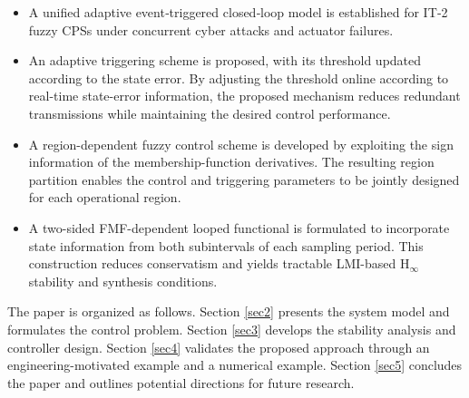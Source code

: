 \documentclass[preprint,review,fleqn,sort&compress,3p]{elsarticle}
\theoremstyle{definition} %
\theoremstyle{definition}%
\begin{document}
\begin{itemize}
	\item[1)] A unified adaptive event‑triggered closed‑loop model is established for IT‑2 fuzzy CPSs under concurrent cyber attacks and actuator failures.
	\item[2)] An adaptive triggering scheme is proposed, with its threshold updated according to the state error. By adjusting the threshold online according to real-time state-error information, the proposed mechanism reduces redundant transmissions while maintaining the desired control performance.
	\item[3)] A region-dependent fuzzy control scheme is developed by exploiting the sign information of the membership-function derivatives. The resulting region partition enables the control and triggering parameters to be jointly designed for each operational region.
	\item[4)] A two-sided FMF-dependent looped functional is formulated to incorporate state information from both subintervals of each sampling period. This construction reduces conservatism and yields tractable LMI-based $\mathrm{H}_\infty$ stability and synthesis conditions.
\end{itemize}

The paper is organized as follows. Section \ref{sec2} presents the system model and formulates the control problem. Section \ref{sec3} develops the stability analysis and controller design. Section \ref{sec4} validates the proposed approach through an engineering-motivated example and a numerical example. Section \ref{sec5} concludes the paper and outlines potential directions for future research.
\end{document}
